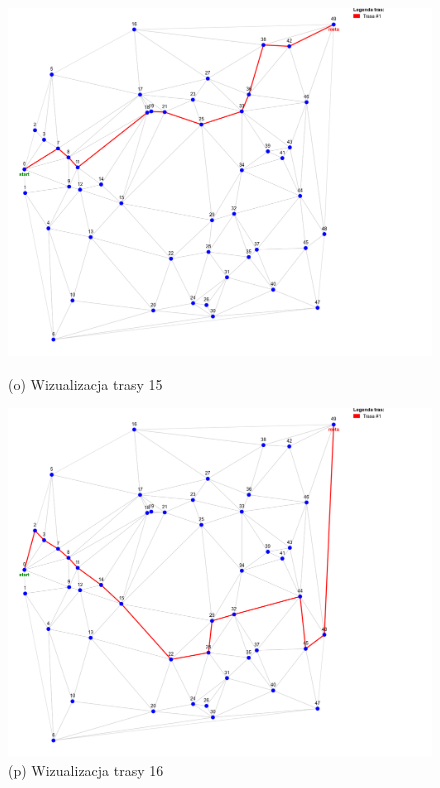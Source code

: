 \documentclass{article}
\begin{document}
\begin{figure}[H]
    \begin{minipage}[b]{0.48\linewidth}
        \includegraphics[width=\linewidth]{15.png}
        \caption*{(o) Wizualizacja trasy 15}
    \end{minipage}
    \hfill
    \begin{minipage}[b]{0.48\linewidth}
        \includegraphics[width=\linewidth]{16.png}
        \caption*{(p) Wizualizacja trasy 16}
    \end{minipage}
    \vspace{0.5em}


\end{figure}
\end{document}

